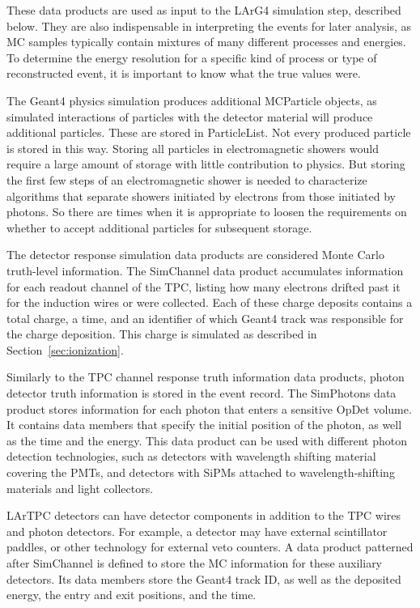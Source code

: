 \documentclass[12pt]{elsarticle}
\begin{document}
These data products are used as input to the LArG4 simulation step, described below. They are also indispensable in interpreting the events for later analysis, as MC samples typically contain mixtures of many different processes and energies. To determine the energy resolution for a specific kind of process or type of reconstructed event, it is important to know what the true values were.

The Geant4 physics simulation produces additional MCParticle objects, as simulated interactions
of particles with the detector material will produce additional particles.  These are stored in ParticleList.  Not every produced particle is stored in this way. Storing all 
particles in electromagnetic showers would require a large amount of storage with little contribution to physics. 
But storing the first few steps of an electromagnetic shower
is needed to characterize algorithms that separate showers initiated by electrons from those initiated by photons. So there are times when it is appropriate to loosen
the requirements on whether to accept additional particles for subsequent storage.

The detector response simulation data products are considered Monte Carlo truth-level information. The SimChannel data product accumulates information for each readout channel of the TPC, listing how many electrons drifted past it for the induction wires or were collected. Each of these charge deposits contains a total charge, a time, and an identifier of which Geant4 track was responsible for the charge deposition. This charge is simulated as described in 
Section~\ref{sec:ionization}.

Similarly to the TPC channel response truth information data products, photon detector truth information
is stored in the event record.  The SimPhotons data product stores information for each photon
that enters a sensitive OpDet volume.  It contains data members that specify the initial position of the
photon, as well as the time and the energy.    
This data product can be used with different photon detection technologies, such as detectors with wavelength shifting material covering the PMTs, and detectors with SiPMs attached to wavelength-shifting materials and light collectors.

LArTPC detectors can have detector components in addition to the TPC wires and photon detectors.
For example, a detector may have external scintillator paddles, or other technology for external veto
counters.   A data product patterned after SimChannel is defined to store the MC information
for these auxiliary detectors.  Its data members store the Geant4 track ID, as well as the deposited energy, the entry and exit positions, and the time.
\end{document}

